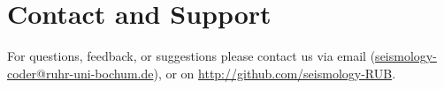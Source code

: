 \chapter{Contact and Support}
\label{contact and support}
For questions, feedback, or suggestions please contact us via email (\url{seismology-coder@ruhr-uni-bochum.de}), or on \url{http://github.com/seismology-RUB}.